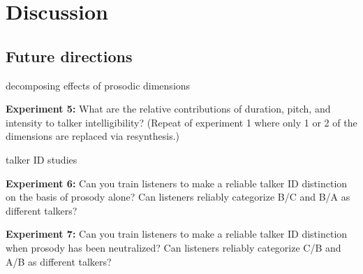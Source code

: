 \chapter{Discussion}

\section{Future directions}
\begin{itm}
	\item{decomposing effects of prosodic dimensions}
	\begin{itm}
		\item{{\bfseries Experiment 5:} What are the relative contributions of duration, pitch, and intensity to talker intelligibility?  (Repeat of experiment 1 where only 1 or 2 of the dimensions are replaced via resynthesis.)}
	\end{itm}
	\item{talker ID studies}
	\begin{itm}
		\item{{\bfseries Experiment 6:} Can you train listeners to make a reliable talker ID distinction on the basis of prosody alone?  Can listeners reliably categorize B/C and B/A as different talkers?}
		\item{{\bfseries Experiment 7:} Can you train listeners to make a reliable talker ID distinction when prosody has been neutralized?  Can listeners reliably categorize C/B and A/B as different talkers?}
	\end{itm}
\end{itm}

